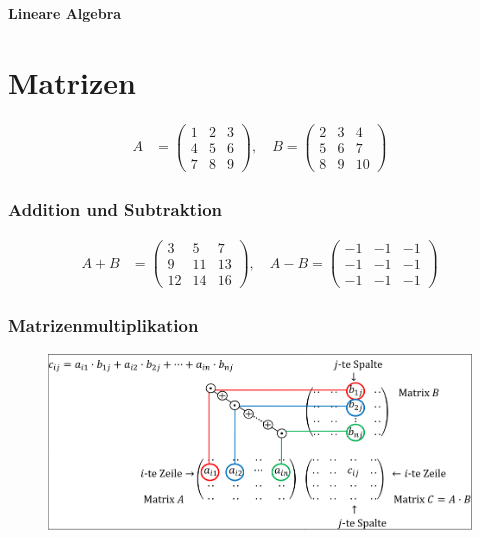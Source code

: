 \documentclass{article}
\begin{document}
\begin{center}
\textbf{\LARGE Lineare Algebra}
\end{center}

\section*{Matrizen}
\begin{minipage}[t]{0.45\textwidth}
    \begin{align*}
        A &= \begin{pmatrix}
        1 & 2 & 3 \\
        4 & 5 & 6 \\
        7 & 8 & 9
        \end{pmatrix}, \quad
        B = \begin{pmatrix}
        2 & 3 & 4 \\
        5 & 6 & 7 \\
        8 & 9 & 10
        \end{pmatrix}
    \end{align*}
    \subsubsection*{Addition und Subtraktion}
    \begin{align*}
    A + B &= \begin{pmatrix}
    3 & 5 & 7 \\
    9 & 11 & 13 \\
    12 & 14 & 16
    \end{pmatrix}, \quad
    A - B = \begin{pmatrix}
    -1 & -1 & -1 \\
    -1 & -1 & -1 \\
    -1 & -1 & -1
    \end{pmatrix}
    \end{align*}

    \subsubsection*{Matrizenmultiplikation}
    \begin{figure}[H]
        \includegraphics[scale=0.2]{images/matrixmult.png}
    \end{figure}
\end{minipage}
\end{document}
